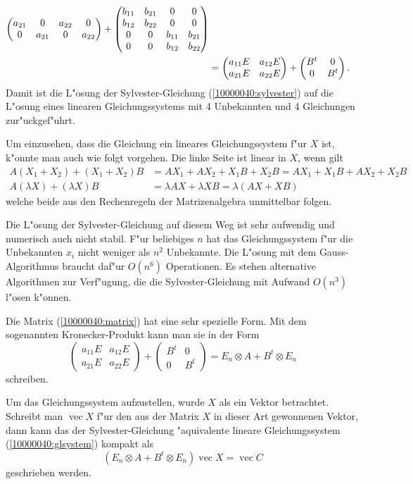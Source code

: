 \begin{loesung}
\begin{align}
\begin{pmatrix}
a_{21}&     0&a_{22}&     0\\
     0&a_{21}&     0&a_{22}
\end{pmatrix}
+
\begin{pmatrix}
b_{11}&b_{21}&     0&     0\\
b_{12}&b_{22}&     0&     0\\
     0&     0&b_{11}&b_{21}\\
     0&     0&b_{12}&b_{22}
\end{pmatrix}
\notag
\\
&=
\begin{pmatrix}
a_{11}E&a_{12}E\\
a_{21}E&a_{22}E
\end{pmatrix}
+
\begin{pmatrix}
B^t&0\\
0&B^t
\end{pmatrix}.
\label{10000040:matrix}
\end{align}
Damit ist die L"osung der Sylvester-Gleichung (\ref{10000040:sylvester}) auf 
die L"osung eines linearen Gleichungssystems mit 4 Unbekannten und 4 Gleichungen
zur"uckgef"uhrt.

Um einzusehen, dass die Gleichung ein lineares Gleichungssystem f"ur $X$ ist,
k"onnte man auch wie folgt vorgehen.
Die linke Seite ist linear in $X$, wenn gilt
\begin{align*}
A(X_1+X_2)+(X_1+X_2)B&=AX_1+AX_2+X_1B+X_2B=AX_1+X_1B + AX_2+X_2B\\
A(\lambda X)+(\lambda X)B&=\lambda AX+\lambda XB=\lambda(AX+XB)
\end{align*}
welche beide aus den Rechenregeln der Matrizenalgebra unmittelbar folgen.
\end{loesung}

\begin{diskussion}
Die L"osung der Sylvester-Gleichung auf diesem Weg ist sehr aufwendig und
numerisch auch nicht stabil. 
F"ur beliebiges $n$ hat das Gleichungssystem f"ur die Unbekannten $x_i$ 
nicht weniger als $n^2$ Unbekannte.
Die L"osung mit dem Gauss-Algorithmus braucht daf"ur $O(n^6)$ Operationen.
Es stehen alternative Algorithmen zur Verf"ugung, die die Sylvester-Gleichung
mit Aufwand $O(n^3)$ l"osen k"onnen.

Die Matrix (\ref{10000040:matrix}) hat eine sehr spezielle Form.
Mit dem sogenannten Kronecker-Produkt kann man sie in der Form
\[
\begin{pmatrix}
a_{11}E&a_{12}E\\
a_{21}E&a_{22}E
\end{pmatrix}
+
\begin{pmatrix}
B^t&0\\
0&B^t
\end{pmatrix}
=
E_n \otimes A
+
B^t \otimes E_n
\]
schreiben.

Um das Gleichungssystem aufzustellen, wurde $X$ als ein Vektor betrachtet.
Schreibt man $\operatorname{vec}X$ f"ur den aus der Matrix $X$ in dieser Art
gewonnenen Vektor, dann kann das der Sylvester-Gleichung "aquivalente
lineare Gleichungssystem (\ref{10000040:glsystem}) kompakt als
\[
(E_n \otimes A
+
B^t \otimes E_n)\operatorname{vec}X
=
\operatorname{vec}C
\]
geschrieben werden.
\end{diskussion}
